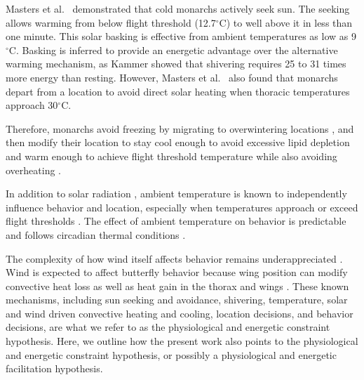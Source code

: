 \documentclass[insects,article,submit,pdftex,moreauthors]{Definitions/mdpi}
\begin{document}
Masters et al.\ \cite{mastersMonarchButterflyDanaus1988} demonstrated that cold monarchs actively seek sun. The seeking allows warming from below flight threshold (12.7$^{\circ}$C) to well above it in less than one minute. This solar basking is effective from ambient temperatures as low as 9$^{\circ}$C. Basking is inferred to provide an energetic advantage over the alternative warming mechanism, as Kammer \cite{kammerThoracicTemperatureShivering1970} showed that shivering requires 25 to 31 times more energy than resting. However, Masters et al.\ \cite{mastersMonarchButterflyDanaus1988} also found that monarchs depart from a location to avoid direct solar heating when thoracic temperatures approach 30$^{\circ}$C.

Therefore, monarchs avoid freezing by migrating to overwintering locations \cite{fisherMultiScaleSpeciesDistribution2024}, and then modify their location to stay cool enough to avoid excessive lipid depletion and warm enough to achieve flight threshold temperature while also avoiding overheating \cite{mastersMonarchButterflyDanaus1988,alonso-mejiaInfluenceTemperatureSurface1992,calvertEffectRainSnow1983,andersonFreezeprotectionOverwinteringMonarch1996}.

In addition to solar radiation \cite{kammerThoracicTemperatureShivering1970,mastersMonarchButterflyDanaus1988}, ambient temperature is known to independently influence behavior and location, especially when temperatures approach or exceed flight thresholds \cite{barkerEffectPhotoperiodTemperature1976}. The effect of ambient temperature on behavior is predictable and follows circadian thermal conditions \cite{mouritsenVirtualMigrationTethered2002}.

The complexity of how wind itself affects behavior remains underappreciated \cite{nathanLongdistanceBiologicalTransport2005}. Wind is expected to affect butterfly behavior because wing position can modify convective heat loss as well as heat gain in the thorax and wings \cite{munroClimateStrongPredictor2019,tsaiPhysicalBehavioralAdaptations2020,krishnaAirTemperatureDrives2021}. These known mechanisms, including sun seeking and avoidance, shivering, temperature, solar and wind driven convective heating and cooling, location decisions, and behavior decisions, are what we refer to as the physiological and energetic constraint hypothesis. Here, we outline how the present work also points to the physiological and energetic constraint hypothesis, or possibly a physiological and energetic facilitation hypothesis.
\end{document}
